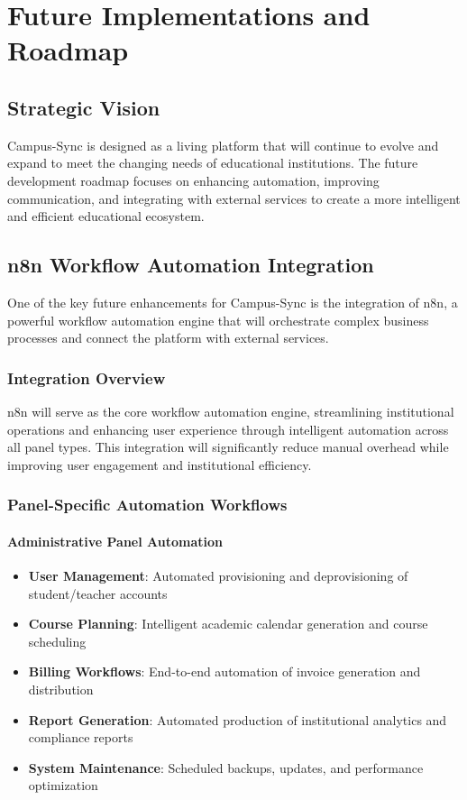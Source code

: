 \chapter{Future Implementations and Roadmap}

\section{Strategic Vision}

Campus-Sync is designed as a living platform that will continue to evolve and expand to meet the changing needs of educational institutions. The future development roadmap focuses on enhancing automation, improving communication, and integrating with external services to create a more intelligent and efficient educational ecosystem.

\section{n8n Workflow Automation Integration}

One of the key future enhancements for Campus-Sync is the integration of n8n, a powerful workflow automation engine that will orchestrate complex business processes and connect the platform with external services.

\subsection{Integration Overview}

n8n will serve as the core workflow automation engine, streamlining institutional operations and enhancing user experience through intelligent automation across all panel types. This integration will significantly reduce manual overhead while improving user engagement and institutional efficiency.

\subsection{Panel-Specific Automation Workflows}

\subsubsection{Administrative Panel Automation}

\begin{itemize}
    \item \textbf{User Management}: Automated provisioning and deprovisioning of student/teacher accounts
    \item \textbf{Course Planning}: Intelligent academic calendar generation and course scheduling
    \item \textbf{Billing Workflows}: End-to-end automation of invoice generation and distribution
    \item \textbf{Report Generation}: Automated production of institutional analytics and compliance reports
    \item \textbf{System Maintenance}: Scheduled backups, updates, and performance optimization
\end{itemize}

